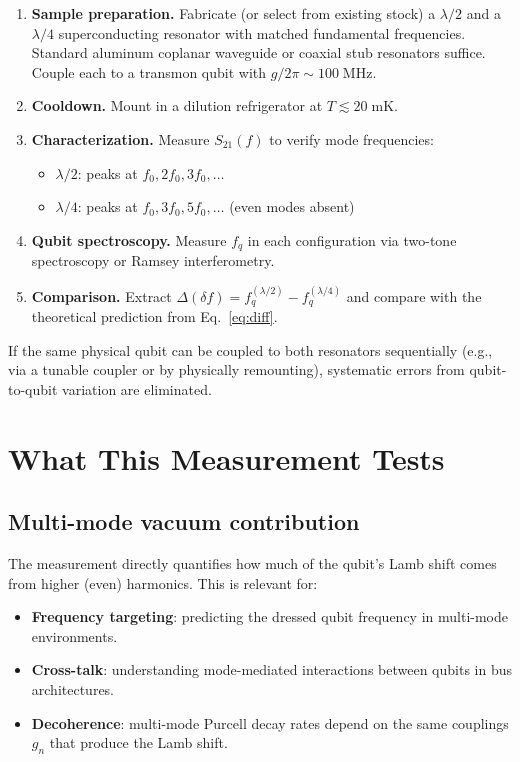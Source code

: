 \documentclass[aps,prl,twocolumn,superscriptaddress,nofootinbib]{revtex4-2}
\begin{document}
\begin{enumerate}
\item \textbf{Sample preparation.}  Fabricate (or select from
existing stock) a $\lambda/2$ and a $\lambda/4$ superconducting
resonator with matched fundamental frequencies.  Standard
aluminum coplanar waveguide or coaxial stub resonators suffice.
Couple each to a transmon qubit with $g/2\pi\sim 100\;\mathrm{MHz}$.

\item \textbf{Cooldown.}  Mount in a dilution refrigerator at
$T\lesssim 20\;\mathrm{mK}$.

\item \textbf{Characterization.}  Measure $S_{21}(f)$ to verify
mode frequencies:
\begin{itemize}
\item $\lambda/2$: peaks at $f_0, 2f_0, 3f_0, \ldots$
\item $\lambda/4$: peaks at $f_0, 3f_0, 5f_0, \ldots$ (even modes absent)
\end{itemize}

\item \textbf{Qubit spectroscopy.}  Measure $f_q$ in each
configuration via two-tone spectroscopy or Ramsey interferometry.

\item \textbf{Comparison.}  Extract
$\Delta(\delta f) = f_q^{(\lambda/2)} - f_q^{(\lambda/4)}$
and compare with the theoretical prediction from
Eq.~\eqref{eq:diff}.
\end{enumerate}

If the same physical qubit can be coupled to both resonators
sequentially (e.g., via a tunable coupler or by physically
remounting), systematic errors from qubit-to-qubit variation
are eliminated.

\section{What This Measurement Tests}

\subsection{Multi-mode vacuum contribution}

The measurement directly quantifies how much of the qubit's Lamb
shift comes from higher (even) harmonics.  This is relevant for:
\begin{itemize}
\item \textbf{Frequency targeting}: predicting the dressed qubit
frequency in multi-mode environments.
\item \textbf{Cross-talk}: understanding mode-mediated interactions
between qubits in bus architectures.
\item \textbf{Decoherence}: multi-mode Purcell decay rates depend
on the same couplings $g_n$ that produce the Lamb shift.
\end{itemize}
\end{document}

